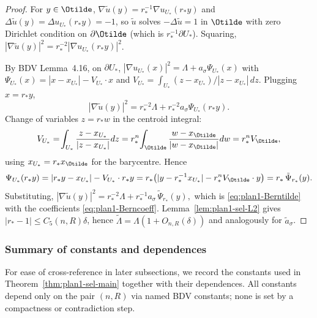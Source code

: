 \begin{proof}
For $y\in\Otilde$, $\nabla\tilde u(y)=r_*^{-1}\nabla u_{U_*}(r_*y)$ and
$\Delta\tilde u(y)=\Delta u_{U_*}(r_*y)=-1$, so $\tilde u$ solves
$-\Delta\tilde u=1$ in $\Otilde$ with zero Dirichlet condition on
$\partial\Otilde$ (which is $r_*^{-1}\partial U_*$). Squaring,
$|\nabla\tilde u(y)|^2=r_*^{-2}|\nabla u_{U_*}(r_*y)|^2$.

By BDV Lemma~4.16, on $\partial U_*$,
$|\nabla u_{U_*}(x)|^2=\Lambda+a_\sigma\Psi_{U_*}(x)$ with
$\Psi_{U_*}(x)=|x-x_{U_*}|-V_{U_*}\cdot x$ and
$V_{U_*}=\int_{U_*}(z-x_{U_*})/|z-x_{U_*}|\,dz$. Plugging $x=r_*y$,
\[
|\nabla\tilde u(y)|^2
=r_*^{-2}\Lambda+r_*^{-2}a_\sigma\Psi_{U_*}(r_*y).
\]
Change of variables $z=r_*w$ in the centroid integral:
\[
V_{U_*}
=\!\int_{U_*}\frac{z-x_{U_*}}{|z-x_{U_*}|}dz
=r_*^{n}\!\int_{\Otilde}\frac{w-x_{\Otilde}}{|w-x_{\Otilde}|}dw
=r_*^{n}V_{\Otilde},
\]
using $x_{U_*}=r_*x_{\Otilde}$ for the barycentre. Hence
\[
\Psi_{U_*}(r_*y)
=|r_*y-x_{U_*}|-V_{U_*}\cdot r_*y
=r_*\bigl(|y-r_*^{-1}x_{U_*}|-r_*^{n}V_{\Otilde}\cdot y\bigr)
=r_*\,\tilde\Psi_{r_*}(y).
\]
Substituting,
\(
|\nabla\tilde u(y)|^2
=r_*^{-2}\Lambda+r_*^{-1}a_\sigma\,\tilde\Psi_{r_*}(y),
\)
which is \eqref{eq:plan1-Berntilde} with the coefficients
\eqref{eq:plan1-Berncoeff}. Lemma~\ref{lem:plan1-sel-L2} gives
$|r_*-1|\le C_5(n,R)\delta$, hence
$\tilde\Lambda=\Lambda(1+O_{n,R}(\delta))$ and analogously for
$\tilde a_\sigma$.
\end{proof}

\subsubsection{Summary of constants and dependences}
\label{subsubsec:plan1-sel-constants}

For ease of cross-reference in later subsections, we record the
constants used in Theorem~\ref{thm:plan1-sel-main} together with their
dependences. All constants depend only on the pair $(n,R)$ via named BDV
constants; none is set by a compactness or contradiction step.

